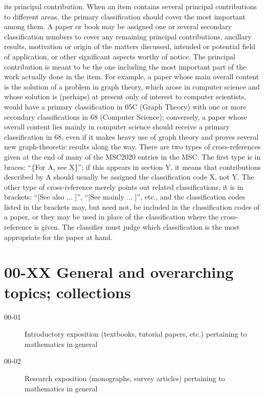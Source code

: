 \documentclass[letterpaper]{article}
\begin{document}
\begin{doublespace}
its   principal contribution.  When  an  item  contains  several  principal  contributions  to  
different
areas, the primary classification should cover the most important among them. A
paper or book may be assigned one or several secondary classification numbers to
cover any remaining principal contributions, ancillary results, motivation or 
origin of
the matters discussed, intended or potential field of application, or other 
significant
aspects worthy of notice.
The principal contribution is meant to be the one including the most important
part of the work actually done in the item. For example, a paper whose main 
overall
content  is  the  solution  of  a  problem  in  graph  theory,  which  arose  in 
 computer
science  and  whose  solution  is  (perhaps)  at  present  only  of  interest  
to  computer
scientists,  would  have  a  primary  classification  in  05C  (Graph  Theory)  
with  one
or  more  secondary  classifications  in  68  (Computer  Science);  conversely,  
a  paper
whose  overall  content  lies  mainly  in  computer  science  should  receive  a 
 primary
classification in 68, even if it makes heavy use of graph theory and proves 
several
new graph-theoretic results along the way.
There are two types of cross-references given at the end of many of the MSC2020 entries
in the MSC. The first type is in braces: “\{For A, see X\}”; if this appears in section
Y,  it  means  that  contributions  described  by  A  should  usually  be  
assigned  the
classification  code  X,  not  Y.  The  other  type  of  cross-reference  
merely 
 points  out
related  classifications;  it  is  in  brackets:  “[See  also
...
]”,  “[See  mainly
...
]”,  etc.,
and the classification codes listed in the brackets may, but need not, be 
included in
the classification codes of a paper, or they may be used in place of the 
classification
where the cross-reference is given. The classifier must judge which 
classification is
the most appropriate for the paper at hand.
\end{doublespace}
\newpage
\section*{00-XX General and overarching topics; collections}\label{00-XX}
\begin{description}
\item [00-01]\label{00-01} Introductory exposition (textbooks, tutorial papers, etc.) pertaining to mathematics in general 
\item [00-02]\label{00-02} Research exposition (monographs, survey articles) pertaining to mathematics in general
\end{description}
\end{document}
